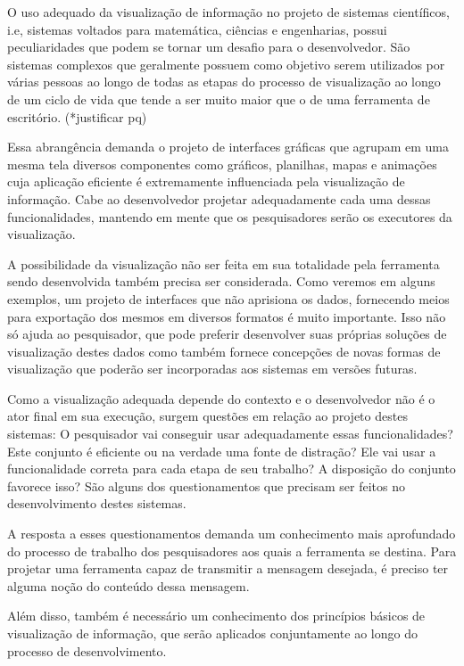 \documentclass[]{article}
\begin{document}
O uso adequado da visualização de informação no projeto de sistemas científicos, i.e, sistemas voltados para matemática, ciências e engenharias, possui peculiaridades que podem se tornar um desafio para o desenvolvedor. São sistemas complexos que geralmente possuem como objetivo serem utilizados por várias pessoas ao longo de todas as etapas do processo de visualização \cite{Fry:2008:VD:1482332} ao longo de um ciclo de vida que tende a ser muito maior que o de uma ferramenta de escritório. (*justificar pq)

Essa abrangência demanda o projeto de interfaces gráficas que agrupam em uma mesma tela diversos componentes como gráficos, planilhas, mapas e animações cuja aplicação eficiente é extremamente influenciada pela visualização de informação. Cabe ao desenvolvedor projetar adequadamente cada uma dessas funcionalidades, mantendo em mente que os pesquisadores serão os executores da visualização.

A possibilidade da visualização não ser feita em sua totalidade pela ferramenta sendo desenvolvida também precisa ser considerada. Como veremos em alguns exemplos, um projeto de interfaces que não aprisiona os dados, fornecendo meios para exportação dos mesmos em diversos formatos é muito importante. Isso não só ajuda ao pesquisador, que pode preferir desenvolver suas próprias soluções de visualização destes dados como também fornece concepções de novas formas de visualização que poderão ser incorporadas aos sistemas em versões futuras.

Como a visualização adequada depende do contexto e o desenvolvedor não é o ator final em sua execução,  surgem questões em relação ao projeto destes sistemas: O pesquisador vai conseguir usar adequadamente essas funcionalidades? Este conjunto é eficiente ou na verdade uma fonte de distração? Ele vai usar a funcionalidade correta para cada etapa de seu trabalho? A disposição do conjunto favorece isso? São alguns dos questionamentos que precisam ser feitos no desenvolvimento destes sistemas.

A resposta a esses questionamentos demanda um conhecimento mais aprofundado do processo de trabalho dos pesquisadores aos quais a ferramenta se destina. Para projetar uma ferramenta capaz de transmitir a mensagem desejada, é preciso ter alguma noção do conteúdo dessa mensagem.

Além disso, também é necessário um conhecimento dos princípios básicos de visualização de informação, que serão aplicados conjuntamente ao longo do processo de desenvolvimento.
\end{document}
